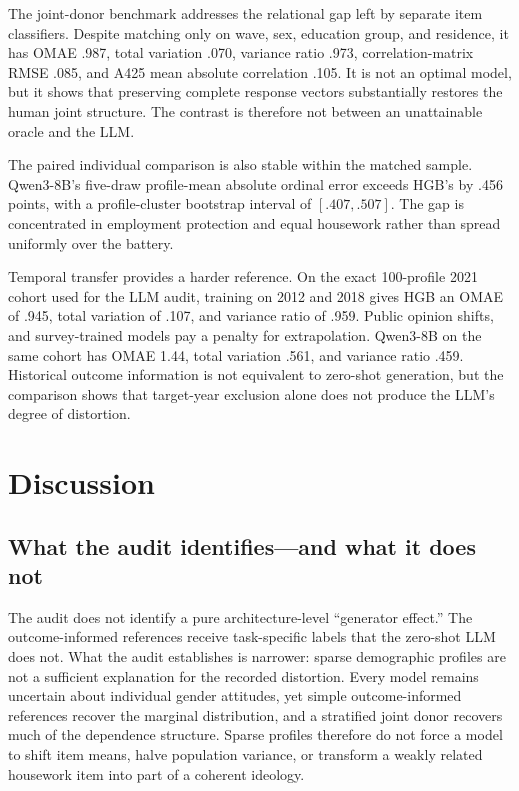 \documentclass[10pt,twocolumn]{article}
\newcommand{\HGB}{HGB\xspace}
\begin{document}
The joint-donor benchmark addresses the relational gap left by separate item classifiers. Despite
matching only on wave, sex, education group, and residence, it has OMAE .987, total variation .070,
variance ratio .973, correlation-matrix RMSE .085, and A425 mean absolute correlation .105. It is
not an optimal model, but it shows that preserving complete response vectors substantially restores
the human joint structure. The contrast is therefore not between an unattainable oracle and the LLM.

The paired individual comparison is also stable within the matched sample. Qwen3-8B's five-draw
profile-mean absolute ordinal error exceeds \HGB's by .456 points, with a profile-cluster bootstrap
interval of $[.407,.507]$. The gap is concentrated in employment protection and equal housework rather than
spread uniformly over the battery.

Temporal transfer provides a harder reference. On the exact 100-profile 2021 cohort used for the
LLM audit, training on 2012 and 2018 gives \HGB an OMAE of .945, total variation of .107, and variance
ratio of .959. Public opinion shifts, and survey-trained models pay a penalty for extrapolation.
Qwen3-8B on the same cohort has OMAE 1.44, total variation .561, and variance ratio .459.
Historical outcome information is not equivalent to zero-shot generation, but the comparison
shows that target-year exclusion alone does not produce the LLM's degree of distortion.

\section{Discussion}

\subsection{What the audit identifies---and what it does not}

The audit does not identify a pure architecture-level ``generator effect.'' The outcome-informed
references receive task-specific labels that the zero-shot LLM does not. What the audit establishes
is narrower: sparse demographic profiles are not a sufficient explanation for the recorded
distortion. Every model remains uncertain about individual gender attitudes, yet simple
outcome-informed references recover the marginal distribution, and a stratified joint donor
recovers much of the dependence structure. Sparse profiles therefore do not force a model to shift
item means, halve population variance, or transform a weakly related housework item into part of a
coherent ideology.
\end{document}

